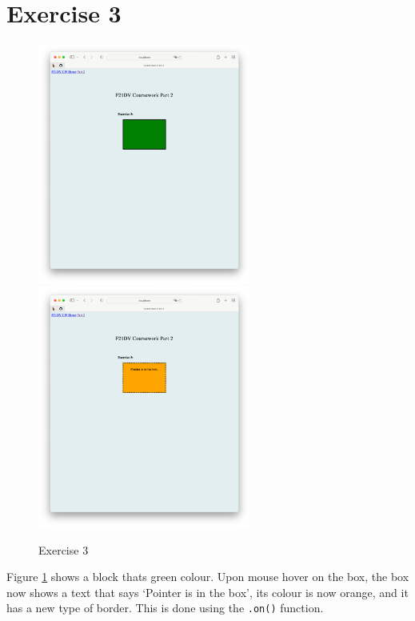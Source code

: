 \documentclass{scrreprt}
\begin{document}
\section{Exercise 3}
\begin{figure}[!ht]
    \centering
    \includegraphics[width = 7cm]{images/ex3_1.png}
    \includegraphics[width = 7cm]{images/ex3_2.png}
    \label{fig:ex3}
    \caption{Exercise 3}
\end{figure}
\FloatBarrier

Figure \ref{fig:ex3} shows a block thats green colour. Upon mouse hover on the box, the box now shows a text that says `Pointer is in the box', its colour is now orange, and it has a new type of border. This is done using the \verb|.on()| function.

\newpage
\end{document}
